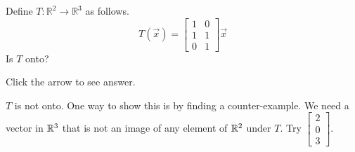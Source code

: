 \documentclass{ximera}
\begin{document}
\begin{problem}\label{prb:10.83b} Define $T:\mathbb{R}^{2}\rightarrow \mathbb{R}^{3}$ as follows.
\begin{equation*}
T(\vec{x})=\left[
\begin{array}{cc}
1 & 0 \\
1 & 1 \\
0 & 1
\end{array}
\right] \vec{x}
\end{equation*}
Is $T$ onto? 

Click the arrow to see answer.

\begin{expandable}
    $T$ is not onto.  One way to show this is by finding a counter-example.  We need a vector in $\mathbb{R}^3$ that is not an image of any element of $\mathbb{R}^2$ under $T$.  Try $\begin{bmatrix}2\\0\\3\end{bmatrix}$.
\end{expandable}

\end{problem}
\end{document}
